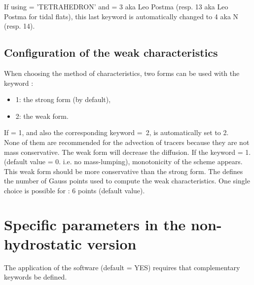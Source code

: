 If using  = 'TETRAHEDRON' and
 = 3 aka Leo Postma
(resp. 13 aka Leo Postma for tidal flats), 
this last keyword is automatically changed to 4 aka N (resp. 14).

\subsection{Configuration of the weak characteristics}

When choosing the method of characteristics, two forms can be used with the
keyword :

\begin{itemize}
\item 1: the strong form (by default),

\item 2: the weak form.
\end{itemize}

If  = 1,
and also the corresponding keyword
 =~2,
 is automatically set to 2.\\

None of them are recommended for the advection of tracers because they are not
mass conservative. The weak form will decrease the diffusion. If the keyword
 = 1. (default value = 0. i.e. no
mass-lumping), monotonicity of the scheme appears. This weak form should be
more conservative than the strong form. The  defines the number of Gauss points used to compute the
weak characteristics. One single choice is possible for : 6 points
(default value).


\section{Specific parameters in the non-hydrostatic version}

The application of the software  (default = YES)
requires that complementary keywords be defined.

